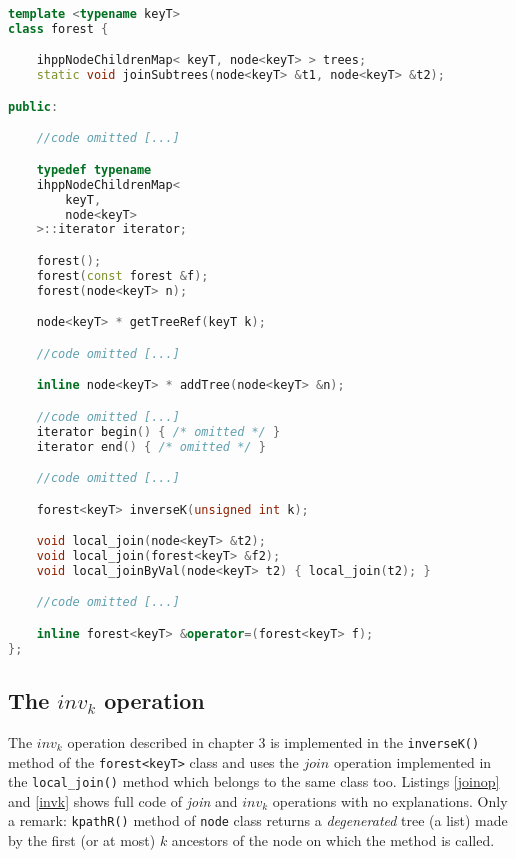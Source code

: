\documentclass[a4paper,10pt]{report}
\begin{document}
\begin{lstlisting}[language=C++,
	caption={partial definition of \texttt{forest<keyT>} class},
	label=forestClass, frame=leftline]
template <typename keyT>
class forest {

	ihppNodeChildrenMap< keyT, node<keyT> > trees;
	static void joinSubtrees(node<keyT> &t1, node<keyT> &t2);

public:

	//code omitted [...]

	typedef typename
	ihppNodeChildrenMap<
		keyT,
		node<keyT>
	>::iterator iterator;

	forest();
	forest(const forest &f);
	forest(node<keyT> n);

	node<keyT> * getTreeRef(keyT k);

	//code omitted [...]

	inline node<keyT> * addTree(node<keyT> &n);

	//code omitted [...]
	iterator begin() { /* omitted */ }
	iterator end() { /* omitted */ }

	//code omitted [...]

	forest<keyT> inverseK(unsigned int k);

	void local_join(node<keyT> &t2);
	void local_join(forest<keyT> &f2);
	void local_joinByVal(node<keyT> t2) { local_join(t2); }

	//code omitted [...]

	inline forest<keyT> &operator=(forest<keyT> f);
};

\end{lstlisting}

\subsection{The $inv_k$ operation}

The $inv_k$ operation described in chapter 3 is implemented
in the \verb|inverseK()| method of the \verb|forest<keyT>| class
and uses the $join$ operation implemented in
the \verb|local_join()| method which belongs to the same class too.
Listings \ref{joinop} and \ref{invk}
shows full code of \emph{join} and $inv_k$ operations with no
explanations. Only a remark: \verb|kpathR()| method of \verb|node| class
returns a \emph{degenerated} tree (a list) made by the first (or at most) $k$
ancestors of the node on which the method is called.
\end{document}
